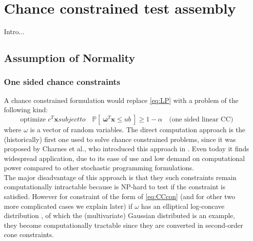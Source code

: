 
\chapter{Chance constrained test assembly} %

\label{Proposed assembly models} %
Intro...




\section{Assumption of Normality}
\subsection{One sided chance constraints}
 A chance constrained formulation would replace \eqref{eq:LP} with a problem of the following kind:
 \begin{subequations} 
 \begin{equation*}
 \text{optimize } c^T \boldsymbol{x}
 \end{equation*}
subject to 
 \begin{equation}\label{eq:CCcon}
 \quad \mathbb{P} \left[ \ \boldsymbol{\omega}^{T}\boldsymbol{x} \leq ub \ \right] \geq 1-\alpha \quad{\text{(one sided linear CC)}}
 \end{equation}
  \end{subequations} 
 where $\omega$ is a vector of random variables.
 The direct computation approach is the (historically) first one used to solve chance constrained problems, since it was proposed by Charnes et al., who introduced this approach in \cite{charnes1958cost}. Even today it finds widespread application, due to its ease of use and low demand on computational power compared to other stochastic programming formulations.\\
 The major disadvantage of this approach is that they such constraints remain computationally intractable because is NP-hard to test if the constraint is satisfied. However for constraint of the form of \eqref{eq:CCcon} (and for other two more complicated cases we explain later) if $\omega$ has an elliptical log-concave distribution \cite{14 in lubin 2016}, of which the (multivariate) Gaussian distributed is an example, they become computationally tractable since they are converted in second-order cone constraints.
